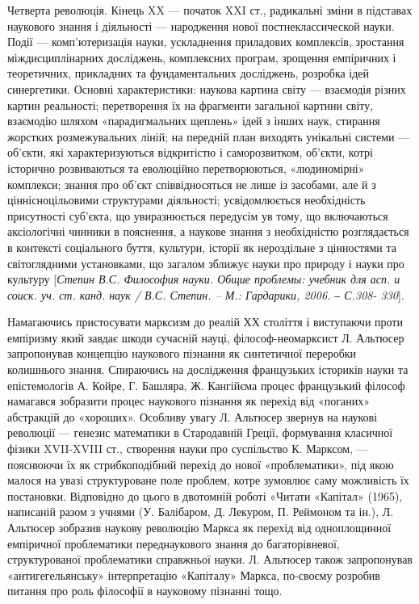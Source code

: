 Четверта революція. Кінець XX --- початок XXI ст., радикальні зміни в
підставах наукового знання і діяльності --- народження нової
постнеклассической науки. Події --- комп’ютеризація науки, ускладнення
приладових комплексів, зростання міждисциплінарних досліджень,
комплексних програм, зрощення емпіричних і теоретичних, прикладних та
фундаментальних досліджень, розробка ідей синергетики. Основні
характеристики: наукова картина світу --- взаємодія різних картин реальності;
перетворення їх на фрагменти загальної картини світу, взаємодію шляхом
«парадигмальних щеплень» ідей з інших наук, стирання жорстких
розмежувальних ліній; на передній план виходять унікальні системи --- об’єкти,
які характеризуються відкритістю і саморозвитком, об’єкти, котрі історично
розвиваються та еволюційно перетворюються, «людиномірні» комплекси;
знання про об’єкт співвідносяться не лише із засобами, але й з ціннісноцільовими структурами діяльності; усвідомлюється необхідність присутності
суб’єкта, що увиразнюється передусім ув тому, що включаються аксіологічні 
чинники в пояснення, а наукове знання з необхідністю розглядається в
контексті соціального буття, культури, історії як нероздільне з цінностями та
світоглядними установками, що загалом зближує науки про природу і науки
про культуру [\textit{Степин В.С. Философия науки. Общие проблемы: учебник для
асп. и соиск. уч. ст. канд. наук / В.С. Степин. – М.: Гардарики, 2006. ‒ С.308-
330}].

Намагаючись пристосувати марксизм до реалій ХХ століття і виступаючи
проти емпіризму який завдає шкоди сучасній науці, філософ-неомарксист Л.
Альтюсер запропонував концепцію наукового пізнання як синтетичної
переробки колишнього знання. Спираючись на дослідження французьких
істориків науки та епістемологів А. Койре, Г. Башляра, Ж. Кангійєма процес
французький філософ намагався зобразити процес наукового пізнання як
перехід від «поганих» абстракцій до «хороших». Особливу увагу Л. Альтюсер
звернув на наукові революції --- генезис математики в Стародавній Греції,
формування класичної фізики XVII-XVIII ст., створення науки про суспільство
К. Марксом, --- пояснюючи їх як стрибкоподібний перехід до нової
«проблематики», під якою малося на увазі структуроване поле проблем, котре
зумовлює саму можливість їх постановки. Відповідно до цього в двотомній
роботі «Читати «Капітал» (1965), написаній разом з учнями (У. Балібаром, Д.
Лекуром, П. Реймоном та ін.), Л. Альтюсер зобразив наукову революцію
Маркса як перехід від одноплощинної емпіричної проблематики
переднаукового знання до багаторівневої, структурованої проблематики
справжньої науки. Л. Альтюсер також запропонував «антигегельянську»
інтерпретацію «Капіталу» Маркса, по-своєму розробив питання про роль
філософії в науковому пізнанні тощо.

